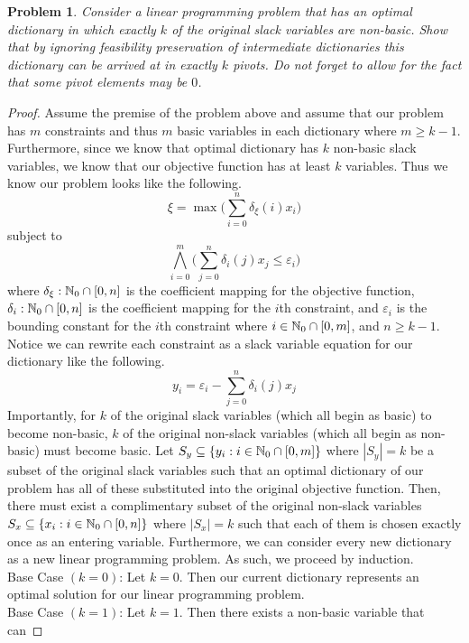\documentclass[12pt,oneside]{amsart}
\numberwithin{equation}{section}
\numberwithin{figure}{section}
\theoremstyle{plain}
\newtheorem{prob}{Problem}
\theoremstyle{definition}
\newcommand{\N}{\ensuremath \mathbb{N}}
\begin{document}
\begin{prob}
Consider a linear programming problem that has an optimal dictionary in which 
exactly $k$ of the original slack variables are non-basic. Show that by ignoring 
feasibility preservation of intermediate dictionaries this dictionary can be 
arrived at in exactly $k$ pivots. Do not forget to allow for the fact that some 
pivot elements may be $0$.
\end{prob}
\begin{proof}
  Assume the premise of the problem above and assume that our problem has $m$ 
  constraints and thus $m$ basic variables in each dictionary where $m \geq k - 
  1$. Furthermore, since we know that optimal dictionary has $k$ non-basic slack 
  variables, we know that our objective function has at least $k$ variables. Thus 
  we know our problem looks like the following.
  \[\xi = \max\bigg(\sum_{i=0}^{n} \delta_{\xi}(i)x_i\bigg)\]
  subject to
  \[\bigwedge_{i=0}^{m} \bigg(\sum_{j=0}^{n} \delta_i(j)x_j \leq \varepsilon_i\bigg)\]
  where $\delta_{\xi}: \N_0 \cap [0,n]$ is the coefficient mapping for the 
  objective function, $\delta_i: \N_0 \cap [0,n]$ is the coefficient mapping for 
  the $i$th constraint, and $\varepsilon_i$ is the bounding constant for the 
  $i$th constraint where $i \in \N_0 \cap [0,m]$, and $n \geq k-1$. Notice we can 
  rewrite each constraint as a slack variable equation for our dictionary like 
  the following. 
  \[y_i = \varepsilon_i - \sum_{j=0}^n \delta_i(j)x_j\]
  Importantly, 
  for $k$ of the original slack variables (which all begin as basic) to become 
  non-basic, $k$ of the original non-slack variables (which all begin as 
  non-basic) must become basic. Let $S_y \subseteq \{y_i : i \in \N_0 \cap 
  [0,m]\}$ where $|S_y| = k$ be a subset of the original slack variables such 
  that an optimal dictionary of our problem has all of these substituted into the 
  original objective function. Then, there must exist a complimentary subset of
  the original non-slack variables $S_x \subseteq \{x_i : i \in \N_0 \cap 
  [0,n]\}$ where $|S_x| = k$ such that each of them is chosen exactly once as an 
  entering variable. Furthermore, we can consider every new dictionary as a new 
  linear programming problem. As such, we proceed by induction. \\
  Base Case $(k = 0)$: Let $k=0$. Then our current dictionary represents an 
  optimal solution for our linear programming problem. \\
  Base Case $(k = 1)$: Let $k=1$. Then there exists a non-basic variable that can 

\end{proof}
\end{document}
